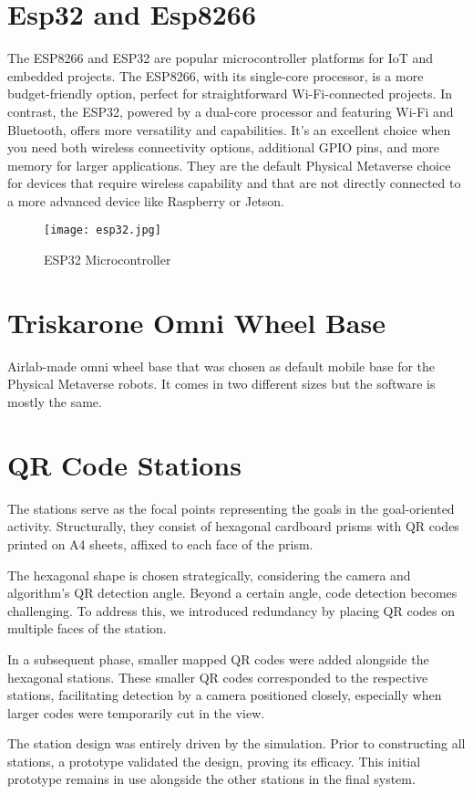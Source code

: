 \documentclass{Configuration_Files/PoliMi3i_thesis}
\begin{document}
\section{Esp32 and Esp8266}
The ESP8266 and ESP32 are popular microcontroller platforms for IoT and embedded projects. The ESP8266, with its single-core processor, is a more budget-friendly option, perfect for straightforward Wi-Fi-connected projects. In contrast, the ESP32, powered by a dual-core processor and featuring Wi-Fi and Bluetooth, offers more versatility and capabilities. It's an excellent choice when you need both wireless connectivity options, additional GPIO pins, and more memory for larger applications.
They are the default Physical Metaverse choice for devices that require wireless capability and that are not directly connected to a more advanced device like Raspberry or Jetson.
\begin{figure}[h]
    \centering
    \texttt{[image: esp32.jpg]}
    \caption{ESP32 Microcontroller}
\end{figure}

\section{Triskarone Omni Wheel Base}
Airlab-made omni wheel base that was chosen as default mobile base for the Physical Metaverse robots. It comes in two different sizes but the software is mostly the same.

\section{QR Code Stations}
The stations serve as the focal points representing the goals in the goal-oriented activity. Structurally, they consist of hexagonal cardboard prisms with QR codes printed on A4 sheets, affixed to each face of the prism.

The hexagonal shape is chosen strategically, considering the camera and algorithm's QR detection angle. Beyond a certain angle, code detection becomes challenging. To address this, we introduced redundancy by placing QR codes on multiple faces of the station.

In a subsequent phase, smaller mapped QR codes were added alongside the hexagonal stations. These smaller QR codes corresponded to the respective stations, facilitating detection by a camera positioned closely, especially when larger codes were temporarily cut in the view.

The station design was entirely driven by the simulation. Prior to constructing all stations, a prototype validated the design, proving its efficacy. This initial prototype remains in use alongside the other stations in the final system.
\end{document}
